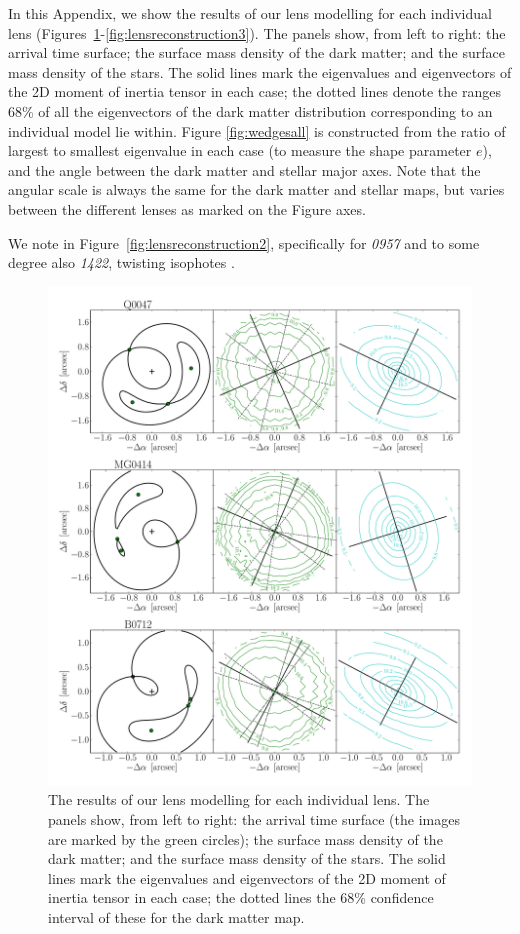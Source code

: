 \documentclass[useAMS,usenatbib]{mn2e}
\begin{document}
In this Appendix, we show the results of our lens modelling for each individual lens (Figures~\ref{fig:lensreconstruction1}-\ref{fig:lensreconstruction3}). The panels show, from left to right: the arrival time surface; the surface mass density of the dark matter; and the surface mass density of the stars. The solid lines mark the eigenvalues and eigenvectors of the 2D moment of inertia tensor in each case; the dotted lines denote the ranges 68\% of all the eigenvectors of the dark matter distribution corresponding to an individual model lie within. Figure \ref{fig:wedgesall} is constructed from the ratio of largest to smallest eigenvalue in each case (to measure the shape parameter $e$), and the angle between the dark matter and stellar major axes. Note that the angular scale is always the same for the dark matter and stellar maps, but varies between the different lenses as marked on the Figure axes.

We note in Figure~\ref{fig:lensreconstruction2}, specifically for {\it0957} and to some degree also {\it1422}, twisting isophotes \citep[e.g.][]{1978ComAp...8...27B}.

\begin{figure}
  \centering
  \includegraphics[width=.8\linewidth]{Figures/AllLenses31.pdf}
  \caption[width=.65\linewidth]{The results of our lens modelling for each individual lens. The panels show, from left to right: the arrival time surface (the images are marked by the green circles); the surface mass density of the dark matter; and the surface mass density of the stars. The solid lines mark the eigenvalues and eigenvectors of the 2D moment of inertia tensor in each case; the dotted lines the 68\% confidence interval of these for the dark matter map.}
  \label{fig:lensreconstruction1}
\end{figure}
\end{document}
